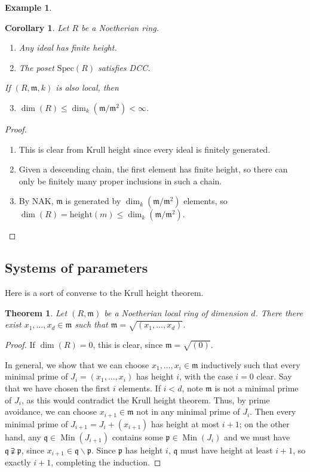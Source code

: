 \documentclass{amsart}[12pt]
\def\htt{\mathrm{height}}
\def\Min{\operatorname{Min}}
\newcommand{\p}{{\mathfrak p}}
\newcommand{\m}{{\mathfrak m}}
\newcommand{\q}{{\mathfrak q}}
\numberwithin{equation}{section}
\theoremstyle{plain} %
\newtheorem{thm}[equation]{Theorem}
\newtheorem{cor}[equation]{Corollary}
\theoremstyle{definition}
\newtheorem{ex}[equation]{Example}
\theoremstyle{remark}
\newcommand{\Spec}{\mathrm{Spec}}
\begin{document}
\begin{ex}
\begin{cor} Let $R$ be a Noetherian ring.
\begin{enumerate}
\item Any ideal has finite height.
\item The poset $\Spec(R)$ satisfies DCC.
\end{enumerate}
If $(R,\m,k)$ is also local, then
\begin{enumerate}\setcounter{enumi}{2}
\item $\dim(R) \leq \dim_k(\m/\m^2) <\infty$.
\end{enumerate}
\end{cor}
\begin{proof}
\begin{enumerate}
\item This is clear from Krull height since every ideal is finitely generated.
\item Given a descending chain, the first element has finite height, so there can only be finitely many proper inclusions in such a chain.
\item By NAK, $\m$ is generated by $\dim_k(\m/\m^2)$ elements, so $\dim(R) = \htt(m) \leq \dim_k(\m/\m^2)$.\qedhere
\end{enumerate}
\end{proof}


\subsection{Systems of parameters}

Here is a sort of converse to the Krull height theorem.

\begin{thm} Let $(R,\m)$ be a Noetherian local ring of dimension $d$. There there exist $x_1,\dots,x_d\in \m$ such that $\m = \sqrt{(x_1,\dots,x_d)}$.
\end{thm}
\begin{proof} If $\dim(R)=0$, this is clear, since $\m=\sqrt{(0)}$.

In general, we show that we can choose $x_1,\dots, x_i\in \m$ inductively such that every minimal prime of $J_i= (x_1,\dots,x_i)$ has height $i$, with the case $i=0$ clear. Say that we have chosen the first $i$ elements. If $i<d$, note $\m$ is not a minimal prime of $J_i$, as this would contradict the Krull height theorem. Thus, by prime avoidance, we can choose $x_{i+1} \in \m$ not in any minimal prime of $J_i$. Then every minimal prime of $J_{i+1} = J_i +(x_{i+1})$ has height at most $i+1$; on the other hand, any $\q\in \Min(J_{i+1})$ contains some $\p \in \Min(J_i)$ and we must have $\q \supsetneqq \p$, since $x_{i+1}\in \q \smallsetminus \p$. Since $\p$ has height $i$, $\q$ must have height at least $i+1$, so exactly $i+1$, completing the induction.


\end{proof}
\end{ex}
\end{document}
